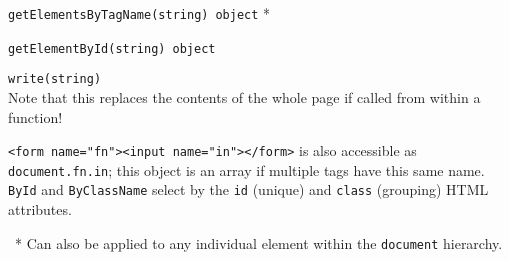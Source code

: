 \documentclass[12pt,letter]{article}
\begin{document}
\begin{multicols}{2}
{{		\texttt{getElementsByTagName(string)}{\scriptsize \textrightarrow\ \texttt{object} *}

		\texttt{getElementById(string)}{\scriptsize \textrightarrow\ \texttt{object}}

		\texttt{write(string)}
		\\
		\hspace*{1em} Note that this replaces the contents of the whole page if called from within a function!

		\vspace{6pt}
		{\small
			\texttt{<form name="fn"><input~name="in"></form>} is also accessible as \texttt{document.fn.in}; this object is an array if multiple tags have this same name.
			\texttt{ById} and \texttt{ByClassName} select by the \texttt{id} (unique) and \texttt{class} (grouping) HTML attributes.

			\ * Can also be applied to any individual element within the \texttt{document} hierarchy.
		}
	}
}

\hfill

\end{multicols}
\end{document}
